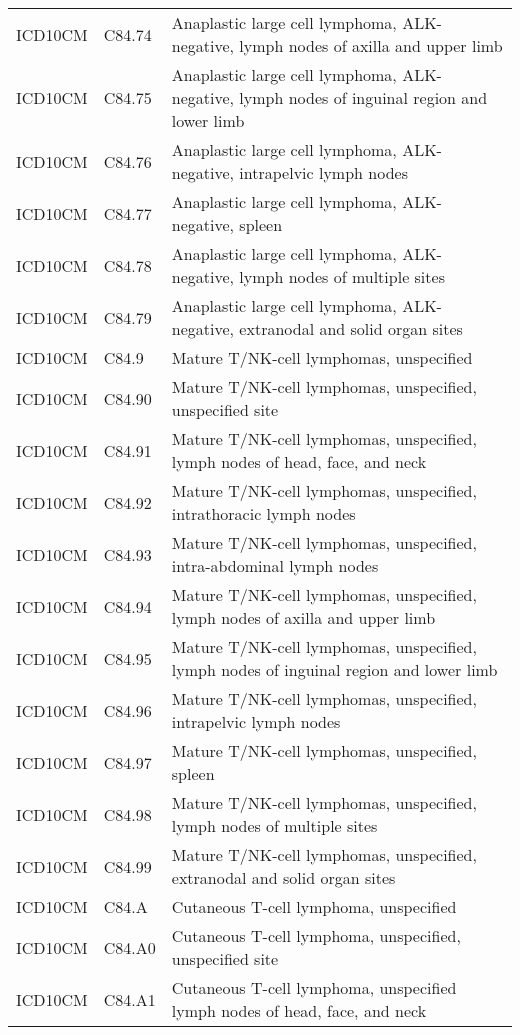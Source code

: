 \begin{longtable}{p{}p{}p{}}
  ICD10CM & C84.74 & Anaplastic large cell lymphoma, ALK-negative, lymph nodes of axilla and upper limb \\ 
  ICD10CM & C84.75 & Anaplastic large cell lymphoma, ALK-negative, lymph nodes of inguinal region and lower limb \\ 
  ICD10CM & C84.76 & Anaplastic large cell lymphoma, ALK-negative, intrapelvic lymph nodes \\ 
  ICD10CM & C84.77 & Anaplastic large cell lymphoma, ALK-negative, spleen \\ 
  ICD10CM & C84.78 & Anaplastic large cell lymphoma, ALK-negative, lymph nodes of multiple sites \\ 
  ICD10CM & C84.79 & Anaplastic large cell lymphoma, ALK-negative, extranodal and solid organ sites \\ 
  ICD10CM & C84.9 & Mature T/NK-cell lymphomas, unspecified \\ 
  ICD10CM & C84.90 & Mature T/NK-cell lymphomas, unspecified, unspecified site \\ 
  ICD10CM & C84.91 & Mature T/NK-cell lymphomas, unspecified, lymph nodes of head, face, and neck \\ 
  ICD10CM & C84.92 & Mature T/NK-cell lymphomas, unspecified, intrathoracic lymph nodes \\ 
  ICD10CM & C84.93 & Mature T/NK-cell lymphomas, unspecified, intra-abdominal lymph nodes \\ 
  ICD10CM & C84.94 & Mature T/NK-cell lymphomas, unspecified, lymph nodes of axilla and upper limb \\ 
  ICD10CM & C84.95 & Mature T/NK-cell lymphomas, unspecified, lymph nodes of inguinal region and lower limb \\ 
  ICD10CM & C84.96 & Mature T/NK-cell lymphomas, unspecified, intrapelvic lymph nodes \\ 
  ICD10CM & C84.97 & Mature T/NK-cell lymphomas, unspecified, spleen \\ 
  ICD10CM & C84.98 & Mature T/NK-cell lymphomas, unspecified, lymph nodes of multiple sites \\ 
  ICD10CM & C84.99 & Mature T/NK-cell lymphomas, unspecified, extranodal and solid organ sites \\ 
  ICD10CM & C84.A & Cutaneous T-cell lymphoma, unspecified \\ 
  ICD10CM & C84.A0 & Cutaneous T-cell lymphoma, unspecified, unspecified site \\ 
  ICD10CM & C84.A1 & Cutaneous T-cell lymphoma, unspecified lymph nodes of head, face, and neck \\ 

\end{longtable}
